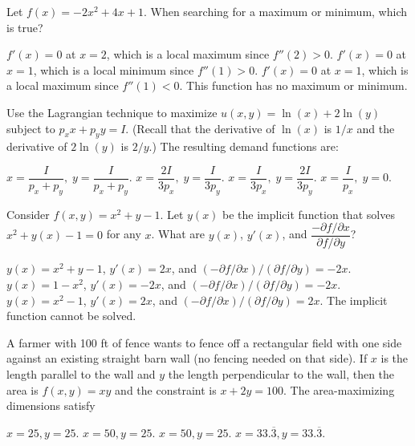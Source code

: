 \documentclass[addpoints,answers,12pt]{exam}
\begin{document}
\begin{questions}


\question[1] Let $f(x) = -2x^2 + 4x + 1$. When searching for a maximum or minimum, which is true?
\begin{choices}
    \choice $f'(x)=0$ at $x=2$, which is a local maximum since $f''(2)>0$.
    \choice $f'(x)=0$ at $x=1$, which is a local minimum since $f''(1)>0$.
    \CorrectChoice $f'(x)=0$ at $x=1$, which is a local maximum since $f''(1)<0$.
    \choice This function has no maximum or minimum.
\end{choices}

\question[1] Use the Lagrangian technique to maximize $u(x,y)=\ln(x) + 2\ln(y)$ subject to $p_x x + p_y y = I$. (Recall that the derivative of $\ln(x)$ is $1/x$ and the derivative of $2\ln(y)$ is $2/y$.) The resulting demand functions are:
\begin{choices}
    \choice $x = \dfrac{I}{p_x + p_y},\; y=\dfrac{I}{p_x + p_y}$.
    \choice $x = \dfrac{2I}{3p_x},\; y=\dfrac{I}{3p_y}$.
    \CorrectChoice $x = \dfrac{I}{3p_x},\; y=\dfrac{2I}{3p_y}$.
    \choice $x = \dfrac{I}{p_x},\; y=0$.
\end{choices}

\question[1] Consider $f(x,y)=x^2+y-1$. Let $y(x)$ be the implicit function that solves $x^2 + y(x) -1 =0$ for any $x$. What are $y(x)$, $y'(x)$, and $\dfrac{-\partial f/\partial x}{\partial f/\partial y}$?
\begin{choices}
    \choice $y(x)=x^2+y-1$, $y'(x)=2x$, and $(-\partial f/\partial x)/(\partial f/\partial y)=-2x$.
    \CorrectChoice $y(x)=1-x^2$, $y'(x)=-2x$, and $(-\partial f/\partial x)/(\partial f/\partial y)=-2x$.
    \choice $y(x)=x^2-1$, $y'(x)=2x$, and $(-\partial f/\partial x)/(\partial f/\partial y)=2x$.
    \choice The implicit function cannot be solved.
\end{choices}


\question[1] A farmer with 100 ft of fence wants to fence off a rectangular field with one side against an existing straight barn wall (no fencing needed on that side). If $x$ is the length parallel to the wall and $y$ the length perpendicular to the wall, then the area is $f(x,y)=xy$ and the constraint is $x + 2y = 100$. The area-maximizing dimensions satisfy
\begin{choices}
    \choice $x=25, y=25$.
    \choice $x=50, y=25$.
    \CorrectChoice $x=50, y=25$.
    \choice $x=33.\overline{3}, y=33.\overline{3}$.
\end{choices}


\end{questions}
\end{document}
